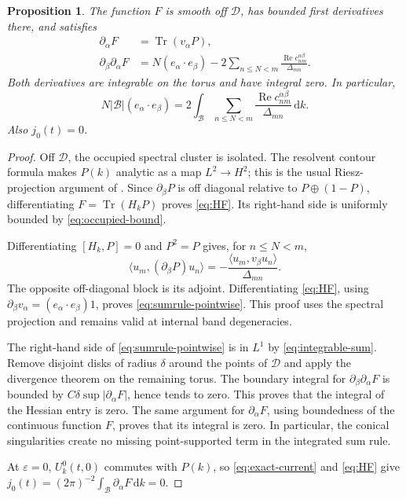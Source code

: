 \documentclass[11pt,a4paper]{article}
\numberwithin{equation}{section}
\newcommand{\cB}{\mathcal B}
\newcommand{\cD}{\mathcal D}
\newcommand{\dd}{\,\mathrm d}
\DeclareMathOperator{\Tr}{Tr}
\DeclareMathOperator{\Rea}{Re}
\newtheorem{proposition}[theorem]{Proposition}
\theoremstyle{remark}
\begin{document}
\begin{proposition}\label{prop:sumrule}
The function $F$ is smooth off $\cD$, has bounded first derivatives
there, and satisfies
\begin{align}
 \partial_\alpha F
     &=\Tr(v_\alpha P),\label{eq:HF}\\
 \partial_\beta\partial_\alpha F
     &=N(e_\alpha\cdot e_\beta)
       -2\sum_{n\leq N<m}
             \frac{\Rea c_{nm}^{\alpha\beta}}{\Delta_{mn}}.
       \label{eq:sumrule-pointwise}
\end{align}
Both derivatives are integrable on the torus and have integral zero.
In particular,
\begin{equation}\label{eq:sumrule-integrated}
 N|\cB|(e_\alpha\cdot e_\beta)
    =2\int_{\cB}\sum_{n\leq N<m}
          \frac{\Rea c_{nm}^{\alpha\beta}}{\Delta_{mn}}\dd k.
\end{equation}
Also $j_0(t)=0$.
\end{proposition}

\begin{proof}
Off $\cD$, the occupied spectral cluster is isolated. The resolvent
contour formula makes $P(k)$ analytic as a map $L^2\to H^2$;
this is the usual Riesz-projection argument of
\cite[Section XII.2]{RS4}. Since $\partial_\beta P$ is off diagonal
relative to $P\oplus(1-P)$, differentiating $F=\Tr(H_kP)$ proves
\eqref{eq:HF}. Its right-hand side is uniformly bounded by
\eqref{eq:occupied-bound}.

Differentiating $[H_k,P]=0$ and $P^2=P$ gives, for $n\leq N<m$,
\[
 \langle u_m,(\partial_\beta P)u_n\rangle
       =-\frac{\langle u_m,v_\beta u_n\rangle}{\Delta_{mn}}.
\]
The opposite off-diagonal block is its adjoint. Differentiating
\eqref{eq:HF}, using
$\partial_\beta v_\alpha=(e_\alpha\cdot e_\beta)1$, proves
\eqref{eq:sumrule-pointwise}. This proof uses the spectral projection
and remains valid at internal band degeneracies.

The right-hand side of \eqref{eq:sumrule-pointwise} is in $L^1$ by
\eqref{eq:integrable-sum}. Remove disjoint disks of radius $\delta$
around the points of $\cD$ and apply the divergence theorem on the
remaining torus. The boundary integral for
$\partial_\beta\partial_\alpha F$ is bounded by
$C\delta\sup|\partial_\alpha F|$, hence tends to zero. This proves
that the integral of the Hessian entry is zero. The same argument for
$\partial_\alpha F$, using boundedness of the continuous function
$F$, proves that its integral is zero. In particular, the conical
singularities create no missing point-supported term in the integrated
sum rule.

At $\varepsilon=0$, $U_k^0(t,0)$ commutes with $P(k)$, so
\eqref{eq:exact-current} and \eqref{eq:HF} give
$j_0(t)=(2\pi)^{-2}\int_{\cB}\partial_\alpha F\dd k=0$.
\end{proof}
\end{document}
